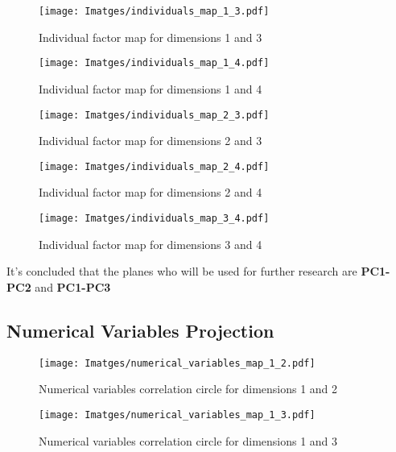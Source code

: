 \begin{figure}[H]
    \centering
    \texttt{[image: Imatges/individuals\_map\_1\_3.pdf]}
    \caption{Individual factor map for dimensions 1 and 3}
    \label{fig:individuals_map_1_3}
\end{figure}

\begin{figure}[H]
    \centering
    \texttt{[image: Imatges/individuals\_map\_1\_4.pdf]}
    \caption{Individual factor map for dimensions 1 and 4}
    \label{fig:individuals_map_1_4}
\end{figure}

\begin{figure}[H]
    \centering
    \texttt{[image: Imatges/individuals\_map\_2\_3.pdf]}
    \caption{Individual factor map for dimensions 2 and 3}
    \label{fig:individuals_map_2_3}
\end{figure}

\begin{figure}[H]
    \centering
    \texttt{[image: Imatges/individuals\_map\_2\_4.pdf]}
    \caption{Individual factor map for dimensions 2 and 4}
    \label{fig:individuals_map_2_4}
\end{figure}

\begin{figure}[H]
    \centering
    \texttt{[image: Imatges/individuals\_map\_3\_4.pdf]}
    \caption{Individual factor map for dimensions 3 and 4}
    \label{fig:individuals_map_3_4}
\end{figure}

It's concluded that the planes who will be used for further research are \textbf{PC1-PC2} and \textbf{PC1-PC3}

\newpage

\subsection{Numerical Variables Projection}

\begin{figure}[H]
    \centering
    \texttt{[image: Imatges/numerical\_variables\_map\_1\_2.pdf]}
    \caption{Numerical variables correlation circle for dimensions 1 and 2}
    \label{fig:numerical_map_1_2}
\end{figure}

\begin{figure}[H]
    \centering
    \texttt{[image: Imatges/numerical\_variables\_map\_1\_3.pdf]}
    \caption{Numerical variables correlation circle for dimensions 1 and 3}
    \label{fig:numerical_map_1_3}
\end{figure}

